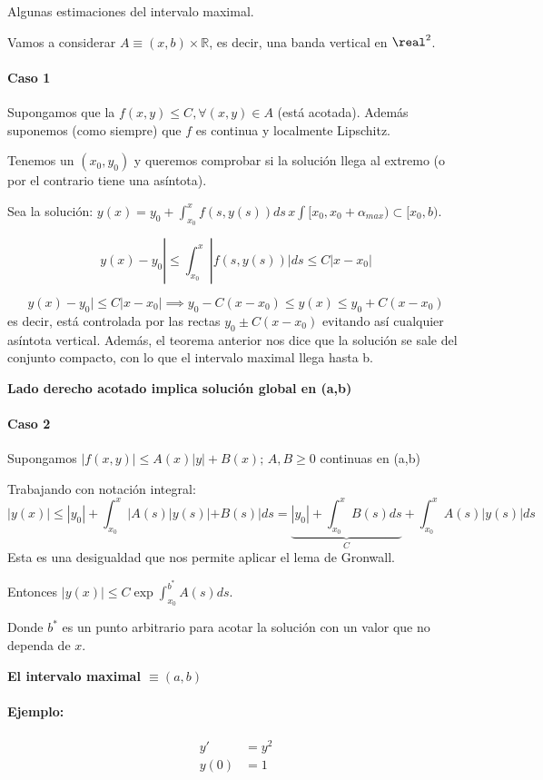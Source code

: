 \documentclass{mathnotes}
\begin{document}
Algunas estimaciones del intervalo maximal. 

Vamos a considerar $A \equiv (x,b)×ℝ$, es decir, una banda vertical en $\real^2$.

\paragraph{Caso 1}
Supongamos que la $f(x,y)\leq C,\forall (x,y)\in A$ (está acotada). Además suponemos (como siempre) que $f$ es continua y localmente Lipschitz.

Tenemos un $(x_0,y_0)$ y queremos comprobar si la solución llega al extremo (o por el contrario tiene una asíntota).

Sea la solución: $\displaystyle y(x) = y_0 + \int_{x_0}^{x} f(s,y(s))ds\, x\int [x_0,x_0+\alpha_{max})\subset [x_0,b)$.

\[y(x) - y_0| \leq \int_{x_0}^x |f(s,y(s))|ds \leq C |x-x_0|\]

\[y(x) - y_0|\leq C |x-x_0| \implies y_0 - C(x-x_0) \leq y(x) \leq y_0 + C(x - x_0)\] es decir, está controlada por las rectas $y_0 \pm C(x-x_0)$ evitando así cualquier asíntota vertical. Además, el teorema anterior nos dice que la solución se sale del conjunto compacto, con lo que el intervalo maximal llega hasta b.

\textbf{Lado derecho acotado implica solución global en (a,b)}

\paragraph{Caso 2} Supongamos $|f(x,y)|\leq A(x)|y| + B(x);\, A,B\ge 0$ continuas en (a,b)

Trabajando con notación integral:
\[|y(x)| \leq  |y_0| + \int_{x_0}^x | A(s)|y(s)| + B(s)|ds = \underbrace{|y_0| + \int_{x_0}^x B(s)ds}_{C} + \int_{x_0}^x A(s)|y(s)|ds \]
Esta es una desigualdad que nos permite aplicar el lema de Gronwall.

Entonces $|y(x)| \leq C \exp{\int_{x_0}^{b^{\ast}} A(s)ds }$.

Donde $b^{\ast}$ es un punto arbitrario para acotar la solución con un valor que no dependa de $x$.

\textbf{El intervalo maximal $\equiv (a,b)$}


\paragraph{Ejemplo:} 
\[\begin{array}{cc}
y'&=y^2\\
y(0)&=1
\end{array}\]
\end{document}
